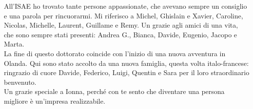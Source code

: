 All'ISAE ho trovato tante persone appassionate, che avevano sempre un consiglio e una parola per rincuorarmi. Mi riferisco a Michel, Ghislain e Xavier, Caroline, Nicolas, Michelle, Laurent, Guillame e Remy. Un grazie agli amici di una vita, che sono sempre stati presenti: Andrea G., Bianca, Davide, Eugenio, Jacopo e Marta. \\

La fine di questo dottorato coincide con l'inizio di una nuova avventura in Olanda. Qui sono stato accolto da una nuova famiglia, questa volta italo-francese: ringrazio di cuore Davide, Federico, Luigi, Quentin e Sara per il loro straordinario benvenuto. \\

Un grazie speciale a Ionna, perché con te sento che diventare una persona migliore è un'impresa realizzabile.


  